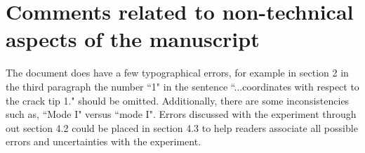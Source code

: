 \documentclass[12pt]{article}
\begin{document}
\section*{Comments related to non-technical aspects of the manuscript} 

The document does have a few  typographical errors, for example in section 2 in the third paragraph the number ``1" in the sentence ``...coordinates with respect to the crack tip 1." should be omitted. Additionally, there are some inconsistencies such as,  ``Mode I" versus ``mode I".  Errors discussed with the experiment through out section 4.2 could be placed in section 4.3 to help readers associate all possible errors and uncertainties with the experiment.
\end{document}
